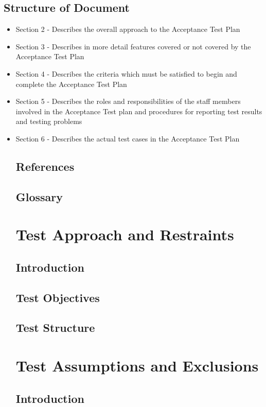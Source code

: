 \documentclass{article}
\begin{document}
\subsection{Structure of Document}
\begin{itemize}
  \item Section 2 - Describes the overall approach to the Acceptance
    Test Plan
  \item Section 3 - Describes in more detail features covered
    or not covered by the Acceptance Test Plan
  \item Section 4 - Describes the criteria which must be satisfied to
    begin and complete the Acceptance Test Plan
  \item Section 5 - Describes the roles and responsibilities of the
    staff members involved in the Acceptance Test plan and procedures for
    reporting test results and testing problems
  \item Section 6 - Describes the actual test cases in the Acceptance
    Test Plan


\subsection{References}
\subsection{Glossary}

\section{Test Approach and Restraints} %

\subsection{Introduction}
\subsection{Test Objectives}
\subsection{Test Structure}

\section{Test Assumptions and Exclusions} %

\subsection{Introduction}

\end{itemize}
\end{document}
